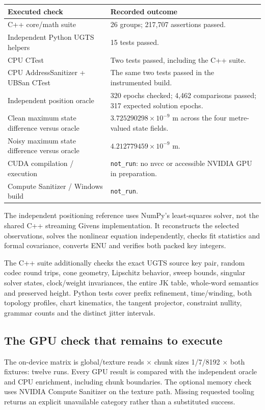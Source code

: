 \documentclass[11pt,a4paper]{article}
\newcommand{\code}[1]{\texttt{#1}}
\begin{document}
\begin{center}
\begin{tabularx}{\textwidth}{@{}P{.41\textwidth}Y@{}}\toprule
\textbf{Executed check} & \textbf{Recorded outcome}\\\midrule
C++ core/math suite & 26 groups; 217,707 assertions passed.\\
Independent Python UGTS helpers & 15 tests passed.\\
CPU CTest & Two tests passed, including the C++ suite.\\
CPU AddressSanitizer + UBSan CTest & The same two tests passed in the instrumented build.\\
Independent position oracle & 320 epochs checked; 4,462 comparisons passed; 317 expected solution epochs.\\
Clean maximum state difference versus oracle & $3.725290298\times10^{-9}$ m across the four metre-valued state fields.\\
Noisy maximum state difference versus oracle & $4.212779459\times10^{-9}$ m.\\
CUDA compilation / execution & \code{not\_run}: no nvcc or accessible NVIDIA GPU in preparation.\\
Compute Sanitizer / Windows build & \code{not\_run}.\\\bottomrule
\end{tabularx}
\end{center}

The independent positioning reference uses NumPy's least-squares solver, not the shared C++ streaming
Givens implementation. It reconstructs the selected observations, solves the nonlinear equation independently,
checks fit statistics and formal covariance, converts ENU and verifies both packed key integers.

The C++ suite additionally checks the exact UGTS source key pair, random codec round trips, cone geometry,
Lipschitz behavior, sweep bounds, singular solver states, clock/weight invariances, the entire JK table,
whole-word semantics and preserved height. Python tests cover prefix refinement, time/winding, both topology
profiles, chart kinematics, the tangent projector, constraint nullity, grammar counts and the distinct jitter intervals.

\subsection{The GPU check that remains to execute}
The on-device matrix is global/texture reads $\times$ chunk sizes 1/7/8192 $\times$ both fixtures: twelve runs.
Every GPU result is compared with the independent oracle and CPU enrichment, including chunk boundaries.
The optional memory check uses NVIDIA Compute Sanitizer on the texture path. Missing requested tooling
returns an explicit unavailable category rather than a substituted success.
\clearpage
\end{document}
